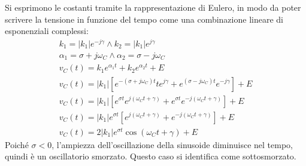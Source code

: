 \documentclass{article}
\numberwithin{equation}{subsection}
\begin{document}
Si esprimono le costanti tramite la rappresentazione di Eulero, in modo da poter scrivere la tensione in funzione del tempo come una combinazione lineare di esponenziali 
complessi:
\begin{gather*}
    k_1=|k_1|e^{-j\gamma}\land k_2=|k_1|e^{j\gamma}\\
    \alpha_1=\sigma+j\omega_C\land \alpha_2=\sigma-j\omega_C\\
    v_C(t)=k_1e^{\alpha_1t}+k_2e^{\alpha_2t}+E\\
    v_C(t)=|k_1|\left[e^{-(\sigma+j\omega_C)t}te^{j\gamma}+e^{(\sigma-j\omega_C)t}e^{-j\gamma}\right]+E\\
    v_C(t)=|k_1|\left[e^{\sigma t}e^{j(\omega_Ct+\gamma)}+e^{\sigma t}e^{-j(\omega_Ct+\gamma)}\right]+E\\
    v_C(t)=|k_1|e^{\sigma t}\left[e^{j(\omega_Ct+\gamma)}+e^{-j(\omega_Ct+\gamma)}\right]+E\\
    v_C(t)=2|k_1|e^{\sigma t}\cos(\omega_Ct+\gamma)+E
\end{gather*}
Poiché $\sigma<0$, l'ampiezza dell'oscillazione della sinusoide diminuisce nel tempo, quindi è un oscillatorio smorzato. Questo caso si identifica come sottosmorzato. 
\end{document}

